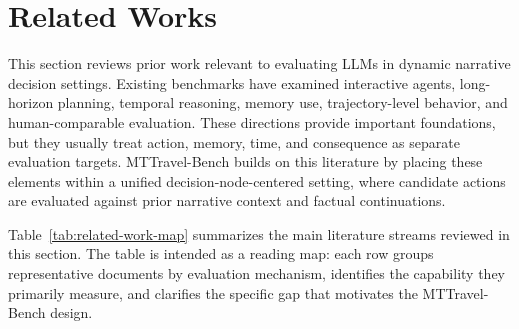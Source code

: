 \documentclass[pdflatex,sn-mathphys-num]{sn-jnl}%
\theoremstyle{thmstyleone}%
\theoremstyle{thmstyletwo}%
\theoremstyle{thmstylethree}%
\begin{document}
\section{Related Works}
This section reviews prior work relevant to evaluating LLMs in dynamic narrative decision settings. Existing benchmarks have examined interactive agents, long-horizon planning, temporal reasoning, memory use, trajectory-level behavior, and human-comparable evaluation. These directions provide important foundations, but they usually treat action, memory, time, and consequence as separate evaluation targets. MTTravel-Bench builds on this literature by placing these elements within a unified decision-node-centered setting, where candidate actions are evaluated against prior narrative context and factual continuations.

Table~\ref{tab:related-work-map} summarizes the main literature streams reviewed in this section. The table is intended as a reading map: each row groups representative documents by evaluation mechanism, identifies the capability they primarily measure, and clarifies the specific gap that motivates the MTTravel-Bench design.
\end{document}
